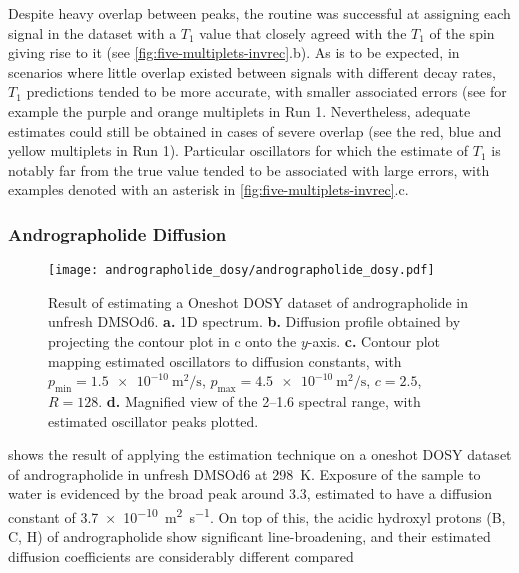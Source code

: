 Despite heavy overlap between peaks, the routine was successful at
assigning each signal in the dataset with a $T_1$ value that closely agreed
with the $T_1$ of the spin giving rise to it (see
\cref{fig:five-multiplets-invrec}.b). As is to be
expected, in scenarios where little overlap existed between signals with
different decay rates, $T_1$ predictions tended to be more accurate, with
smaller associated errors (see for example the purple and orange multiplets in Run 1.
Nevertheless, adequate estimates could still be obtained in cases of severe
overlap (see the red, blue and yellow multiplets in Run 1). Particular
oscillators for which the estimate of $T_1$ is notably far from the true
value tended to be associated with large errors, with examples denoted with an
asterisk in \cref{fig:five-multiplets-invrec}.c.

\subsubsection{Andrographolide Diffusion}
\begin{sidewaysfigure}
    \centering
    \texttt{[image: andrographolide\_dosy/andrographolide\_dosy.pdf]}
    \caption[
        Result of estimating a Oneshot \acs{DOSY} dataset of andrographolide.
    ]{
        Result of estimating a Oneshot \ac{DOSY} dataset of andrographolide in
        unfresh \acs{DMSOd6}.
        \textbf{a.} \ac{1D} spectrum.
        \textbf{b.} Diffusion profile obtained by projecting the contour plot in
        c onto the $y$-axis.
        \textbf{c.} Contour plot mapping estimated oscillators to diffusion constants, with
        $p_{\text{min}} = \qty{1.5e-10}{\meter\squared\per\second}$,
        $p_{\text{max}} = \qty{4.5e-10}{\meter\squared\per\second}$,
        $c = 2.5$,
        $R=128$.
        \textbf{d.} Magnified view of the \SIrange{2}{1.6}{\partspermillion}
        spectral range, with estimated oscillator peaks plotted.
    }
    \label{fig:andrographolide-dosy}
\end{sidewaysfigure}
 shows the result of applying the
estimation technique on a oneshot \ac{DOSY} dataset of andrographolide in
unfresh \acs{DMSOd6} at \qty{298}{\kelvin}. Exposure of the sample to water is
evidenced by the broad
peak around \qty{3.3}{\partspermillion}, estimated to have a diffusion constant
of \qty{3.7e-10}{\meter\squared\per\second}. On top of this, the acidic
hydroxyl protons (B, C, H) of andrographolide show significant line-broadening,
and their estimated diffusion coefficients are considerably different compared
